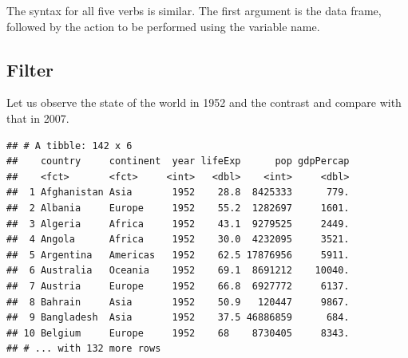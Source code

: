 \documentclass[12pt,]{article}
\newenvironment{Shaded}{\begin{snugshade}}{\end{snugshade}}
\newcommand{\KeywordTok}[1]{\textcolor[rgb]{0.13,0.29,0.53}{\textbf{#1}}}
\newcommand{\DecValTok}[1]{\textcolor[rgb]{0.00,0.00,0.81}{#1}}
\newcommand{\StringTok}[1]{\textcolor[rgb]{0.31,0.60,0.02}{#1}}
\newcommand{\CommentTok}[1]{\textcolor[rgb]{0.56,0.35,0.01}{\textit{#1}}}
\newcommand{\OperatorTok}[1]{\textcolor[rgb]{0.81,0.36,0.00}{\textbf{#1}}}
\newcommand{\NormalTok}[1]{#1}
\begin{document}
The syntax for all five verbs is similar. The first argument is the data
frame, followed by the action to be performed using the variable name.

\subsection{Filter}\label{filter}

Let us observe the state of the world in 1952 and the contrast and
compare with that in 2007.

\begin{Shaded}
\end{Shaded}

\begin{verbatim}
## # A tibble: 142 x 6
##    country     continent  year lifeExp      pop gdpPercap
##    <fct>       <fct>     <int>   <dbl>    <int>     <dbl>
##  1 Afghanistan Asia       1952    28.8  8425333      779.
##  2 Albania     Europe     1952    55.2  1282697     1601.
##  3 Algeria     Africa     1952    43.1  9279525     2449.
##  4 Angola      Africa     1952    30.0  4232095     3521.
##  5 Argentina   Americas   1952    62.5 17876956     5911.
##  6 Australia   Oceania    1952    69.1  8691212    10040.
##  7 Austria     Europe     1952    66.8  6927772     6137.
##  8 Bahrain     Asia       1952    50.9   120447     9867.
##  9 Bangladesh  Asia       1952    37.5 46886859      684.
## 10 Belgium     Europe     1952    68    8730405     8343.
## # ... with 132 more rows
\end{verbatim}

\begin{Shaded}
\end{Shaded}
\end{document}
